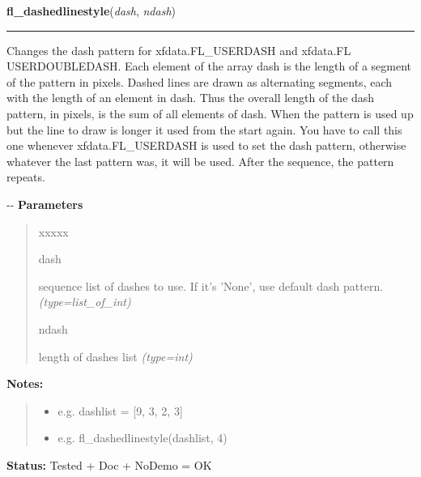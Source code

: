     \label{xformslib:flxbasic:fl_dashedlinestyle}

    \vspace{0.5ex}

\hspace{.8\funcindent}\begin{boxedminipage}{\funcwidth}

    \raggedright \textbf{fl\_dashedlinestyle}(\textit{dash}, \textit{ndash})

    \vspace{-1.5ex}

    \rule{\textwidth}{0.5\fboxrule}
\setlength{\parskip}{2ex}

Changes the dash pattern for xfdata.FL\_USERDASH and
xfdata.FL USERDOUBLEDASH. Each element of the array dash is the length of
a segment of the pattern in pixels. Dashed lines are drawn as alternating
segments, each with the length of an element in dash. Thus the overall
length of the dash pattern, in pixels, is the sum of all elements of dash.
When the pattern is used up but the line to draw is longer it used from the
start again. You have to call this one whenever xfdata.FL\_USERDASH is used
to set the dash pattern, otherwise whatever the last pattern was, it will
be used. After the sequence, the pattern repeats.

-{}-
\setlength{\parskip}{1ex}
      \textbf{Parameters}
      \vspace{-1ex}

      \begin{quote}
        \begin{Ventry}{xxxxx}

          \item[dash]


sequence list of dashes to use. If it's 'None', use default dash
pattern.
            {\it (type=list\_of\_int)}

          \item[ndash]


length of dashes list
            {\it (type=int)}

        \end{Ventry}

      \end{quote}

\textbf{Notes:}
\begin{quote}
  \begin{itemize}

  \item
    \setlength{\parskip}{0.6ex}

e.g. dashlist = {[}9, 3, 2, 3{]}


  \item 
e.g. fl\_dashedlinestyle(dashlist, 4)


\end{itemize}

\end{quote}

\textbf{Status:} 
Tested + Doc + NoDemo = OK


    \end{boxedminipage}

